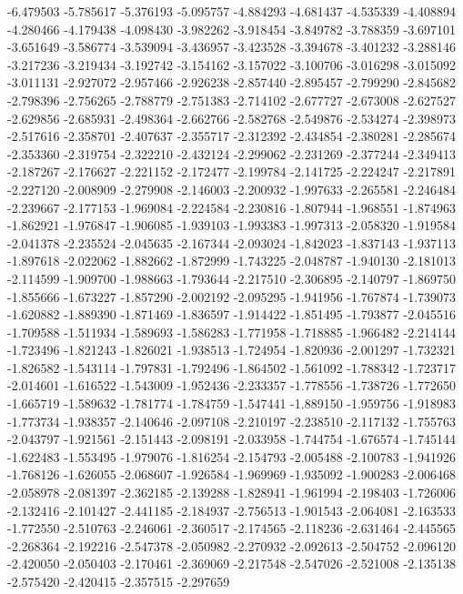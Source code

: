 -6.479503
-5.785617
-5.376193
-5.095757
-4.884293
-4.681437
-4.535339
-4.408894
-4.280466
-4.179438
-4.098430
-3.982262
-3.918454
-3.849782
-3.788359
-3.697101
-3.651649
-3.586774
-3.539094
-3.436957
-3.423528
-3.394678
-3.401232
-3.288146
-3.217236
-3.219434
-3.192742
-3.154162
-3.157022
-3.100706
-3.016298
-3.015092
-3.011131
-2.927072
-2.957466
-2.926238
-2.857440
-2.895457
-2.799290
-2.845682
-2.798396
-2.756265
-2.788779
-2.751383
-2.714102
-2.677727
-2.673008
-2.627527
-2.629856
-2.685931
-2.498364
-2.662766
-2.582768
-2.549876
-2.534274
-2.398973
-2.517616
-2.358701
-2.407637
-2.355717
-2.312392
-2.434854
-2.380281
-2.285674
-2.353360
-2.319754
-2.322210
-2.432124
-2.299062
-2.231269
-2.377244
-2.349413
-2.187267
-2.176627
-2.221152
-2.172477
-2.199784
-2.141725
-2.224247
-2.217891
-2.227120
-2.008909
-2.279908
-2.146003
-2.200932
-1.997633
-2.265581
-2.246484
-2.239667
-2.177153
-1.969084
-2.224584
-2.230816
-1.807944
-1.968551
-1.874963
-1.862921
-1.976847
-1.906085
-1.939103
-1.993383
-1.997313
-2.058320
-1.919584
-2.041378
-2.235524
-2.045635
-2.167344
-2.093024
-1.842023
-1.837143
-1.937113
-1.897618
-2.022062
-1.882662
-1.872999
-1.743225
-2.048787
-1.940130
-2.181013
-2.114599
-1.909700
-1.988663
-1.793644
-2.217510
-2.306895
-2.140797
-1.869750
-1.855666
-1.673227
-1.857290
-2.002192
-2.095295
-1.941956
-1.767874
-1.739073
-1.620882
-1.889390
-1.871469
-1.836597
-1.914422
-1.851495
-1.793877
-2.045516
-1.709588
-1.511934
-1.589693
-1.586283
-1.771958
-1.718885
-1.966482
-2.214144
-1.723496
-1.821243
-1.826021
-1.938513
-1.724954
-1.820936
-2.001297
-1.732321
-1.826582
-1.543114
-1.797831
-1.792496
-1.864502
-1.561092
-1.788342
-1.723717
-2.014601
-1.616522
-1.543009
-1.952436
-2.233357
-1.778556
-1.738726
-1.772650
-1.665719
-1.589632
-1.781774
-1.784759
-1.547441
-1.889150
-1.959756
-1.918983
-1.773734
-1.938357
-2.140646
-2.097108
-2.210197
-2.238510
-2.117132
-1.755763
-2.043797
-1.921561
-2.151443
-2.098191
-2.033958
-1.744754
-1.676574
-1.745144
-1.622483
-1.553495
-1.979076
-1.816254
-2.154793
-2.005488
-2.100783
-1.941926
-1.768126
-1.626055
-2.068607
-1.926584
-1.969969
-1.935092
-1.900283
-2.006468
-2.058978
-2.081397
-2.362185
-2.139288
-1.828941
-1.961994
-2.198403
-1.726006
-2.132416
-2.101427
-2.441185
-2.184937
-2.756513
-1.901543
-2.064081
-2.163533
-1.772550
-2.510763
-2.246061
-2.360517
-2.174565
-2.118236
-2.631464
-2.445565
-2.268364
-2.192216
-2.547378
-2.050982
-2.270932
-2.092613
-2.504752
-2.096120
-2.420050
-2.050403
-2.170461
-2.369069
-2.217548
-2.547026
-2.521008
-2.135138
-2.575420
-2.420415
-2.357515
-2.297659
